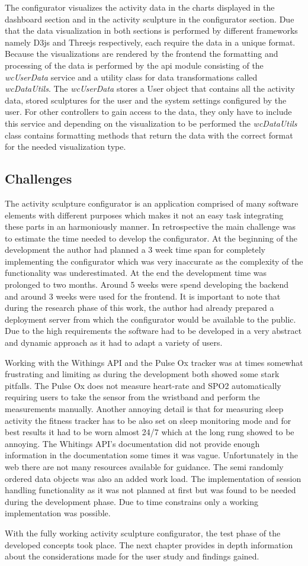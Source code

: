 \documentclass[../medieninformatik-arbeit.tex]{subfiles}
\begin{document}
The configurator visualizes the activity data in the charts displayed in the dashboard section and in the activity sculpture in the configurator section. Due that the data visualization in both sections is performed by different frameworks namely D3js and Threejs respectively, each require the data in a unique format. Because the visualizations are rendered by the frontend the formatting and processing of the data is performed by the api module consisting of the \textit{wcUserData} service and a utility class for data transformations called \textit{wcDataUtils}. The \textit{wcUserData} stores a User object that contains all the activity data, stored sculptures for the user and the system settings configured by the user. For other controllers to gain access to the data, they only have to include this service and depending on the visualization to be performed the \textit{wcDataUtils} class contains formatting methods that return the data with the correct format for the needed visualization type. 

\subsection{Challenges}
The activity sculpture configurator is an application comprised of many software elements with different purposes which makes it not an easy task integrating these parts in an harmoniously manner. In retrospective the main challenge was to estimate the time needed to develop the configurator. At the beginning of the development the author had planned a 3 week time span for completely implementing the configurator which was very inaccurate as the complexity of the functionality was underestimated. At the end the development time was prolonged to two months. Around 5 weeks were spend developing the backend and around 3 weeks were used for the frontend. It is important to note that during the research phase of this work, the author had already prepared a deployment server from which the configurator would be available to the public. Due to the high requirements the software had to be developed in a very abstract and dynamic approach as it had to adapt a variety of users. 

Working with the Withings API and the Pulse Ox tracker was at times somewhat frustrating and limiting as during the development both showed some stark pitfalls. The Pulse Ox does not measure heart-rate and SPO2 automatically requiring users to take the sensor from the wristband and perform the measurements manually. Another annoying detail is that for measuring sleep activity the fitness tracker has to be also set on sleep monitoring mode and for best results it had to be worn almost 24/7 which at the long rung showed to be annoying. The Whitings API's documentation did not provide enough information in the documentation some times it was vague. Unfortunately in the web there are not many resources available for guidance. The semi randomly ordered data objects was also an added work load. The implementation of session handling functionality as it was not planned at first but was found to be needed during the development phase. Due to time constrains only a working implementation was possible. 

With the fully working activity sculpture configurator, the test phase of the developed concepts took place. The next chapter provides in depth information about the considerations made for the user study and findings gained. 
\end{document}
